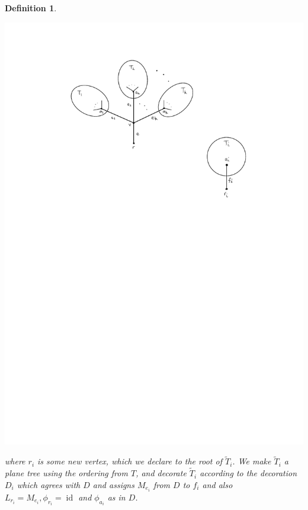\documentclass[english,letter paper,12pt,leqno]{article}
\theoremstyle{example}
\newtheorem{definition}[theorem]{Definition}
\newtheorem{example}[theorem]{Example}
\numberwithin{equation}{section}
\begin{document}
\begin{definition}
\begin{center}
\includegraphics[scale=0.9]{dia18}
\end{center}
where $r_i$ is some new vertex, which we declare to the root of $\widetilde{T}_i$. We make $\widetilde{T}_i$ a plane tree using the ordering from $T$, and decorate $\widetilde{T}_i$ according to the decoration $D_i$ which agrees with $D$ and assigns $M_{e_i}$ from $D$ to $f_i$ and also $L_{r_i} = M_{e_i}, \phi_{r_i} = \operatorname{id}$ and $\phi_{a_i}$ as in $D$.
\end{definition}

\end{document}
